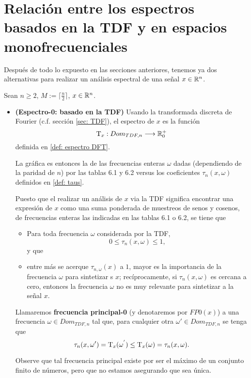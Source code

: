 \section{Relación entre los espectros basados en la TDF y en espacios monofrecuenciales}

Después de todo lo expuesto en las secciones anteriores, tenemos
ya dos alternativas para realizar un análisis
espectral de una señal $x \in \mathbb{R}^{n}$.

Sean $n \geq 2$, $M := \lceil \frac{n}{2} \rceil$, $x \in \mathbb{R}^{n}$.
\begin{itemize}
	\item \textbf{(Espectro-0: basado en la TDF)} 
	Usando la transformada discreta de Fourier
	(c.f. sección \ref{sec: TDF}),
	el espectro de $x$ es la función
	\[
	\mathrm{T}_{x}: Dom_{TDF, n} \longrightarrow \mathbb{R}^{+}_{0}
	\]	
	definida en \ref{def: espectro DFT}.
	
	La gráfica es entonces la de las frecuencias
	enteras $\omega$ dadas (dependiendo de la 
	paridad de $n$) por las
	tablas 6.1 y 6.2
	versus los coeficientes
	$\tau_{n}(x, \omega)$ definidos en
	\ref{def: taus}.
	
	Puesto que el realizar un análisis de 
	$x$ via la TDF significa encontrar una
	expresión de $x$ como una suma
	ponderada de muestreos de senos y cosenos,
	de frecuencias enteras las indicadas en las tablas 6.1 o 6.2,
	se tiene que  
	\begin{itemize}
		\item Para toda frecuencia $\omega$ considerada
		por la TDF,
		\[
		0 \leq \tau_{n}(x, \omega) \leq 1,
		\]
		y que
		\item entre más se acerque
		$\tau_{n, \omega}(x)$
		a $1$, mayor es la
		importancia de la frecuencia $\omega$ para
		sintetizar s $x$; recíprocamente, si 
		$\tau_{n}(x, \omega)$ es cercana a cero, entonces
		la frecuencia $\omega$ no es muy relevante para 
		sintetizar a la señal $x$.
	\end{itemize}
	\begin{defi}
	\label{def: FM0}
	Llamaremos \textbf{frecuencia principal-0}
	(y denotaremos por $FP0(x)$) 
	a una 
	frecuencia $\omega \in Dom_{TDF, n}$
	tal que, para cualquier otra $\omega' \in Dom_{TDF, n}$ 
	se tenga que 
	\[
	\tau_{n}(x, \omega') = \mathrm{T}_{x}(\omega^{'}) \leq
	\mathrm{T}_{x}(\omega) =  
	 \tau_{n}(x, \omega).
	\]
	\end{defi}
	Observe que tal frecuencia principal existe por ser 
	el máximo de un conjunto finito de números, pero que no 
	estamos asegurando que sea única. 
	

\end{itemize}
